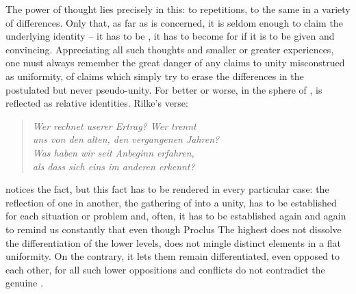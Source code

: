 The power of thought lies precisely in this: to 
{repetitions}, to  the same in a variety of
differences.  Only that, as far as  is concerned, it is
seldom enough to claim the underlying identity -- it has to be
, it has to become  for
 if it is to be  given and convincing. 
Appreciating all such thoughts and smaller or greater experiences, one
must always remember the great danger of any claims to unity
misconstrued as uniformity, of claims which simply try to erase the
differences in the postulated but never  pseudo-unity. 
For better or worse, in the sphere of , 
is reflected as relative identities.  Rilke's verse:
%
\begin{verse}
{\small{\em Wer rechnet userer Ertrag? Wer trennt\\
uns von den alten, den vergangenen Jahren?\\
Was haben wir seit Anbeginn erfahren, \\
als dass sich eins im anderen erkennt?~
}}\end{verse}
%
notices the fact, but this fact has to be rendered  in
every particular case: the reflection of one in another, the gathering
of  into a unity, has to be established for
each situation or problem and, often, it has to be established again
and again to remind us constantly that  even though \citet{they are
  different from each other to the degree, in which they are many.}{Proclus}{}
The highest  does not dissolve the differentiation of the lower
levels, does not mingle distinct elements in a flat uniformity. On the contrary,
it lets them remain differentiated, even opposed to 
each other, for all such lower oppositions and conflicts do not contradict the
genuine . 


